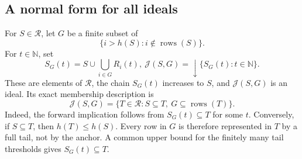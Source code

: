 \documentclass[10pt,a4paper]{article}
\theoremstyle{definition}
\newcommand{\N}{\mathbb N}
\newcommand{\RR}{\mathcal R}
\newcommand{\rows}{\operatorname{rows}}
\begin{document}
\subsection{A normal form for all ideals}
For $S\in\RR$, let $G$ be a finite subset of
\[
 \{i>h(S):i\notin\rows(S)\}.
\]
For $t\in\N$, set
\[
 S_G(t)=S\cup\bigcup_{i\in G}R_i(t),
 ~
 \mathcal J(S,G)={\downarrow}\{S_G(t):t\in\N\}.
\]
These are elements of $\RR$, the chain $S_G(t)$ increases to $S$, and $\mathcal J(S,G)$ is an ideal. Its exact membership description is
\begin{equation}\label{fan:membership}
 \mathcal J(S,G)
 =\{T\in\RR:S\subseteq T,\ G\subseteq\rows(T)\}.
\end{equation}
Indeed, the forward implication follows from $S_G(t)\subseteq T$ for some $t$. Conversely, if $S\subseteq T$, then $h(T)\leq h(S)$. Every row in $G$ is therefore represented in $T$ by a full tail, not by the anchor. A common upper bound for the finitely many tail thresholds gives $S_G(t)\subseteq T$.
\end{document}
